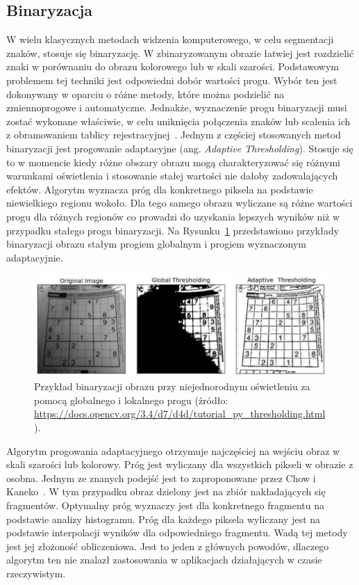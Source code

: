\subsection{Binaryzacja}\label{subsec:binaryzacja}
W wielu klasycznych metodach widzenia komputerowego, w celu segmentacji znaków, stosuje się binaryzację.
W zbinaryzowanym obrazie łatwiej jest rozdzielić znaki w porównaniu do obrazu kolorowego lub w skali szarości.
Podstawowym problemem tej techniki jest odpowiedni dobór wartości progu.
Wybór ten jest dokonywany w oparciu o różne metody, które można podzielić na zmiennoprogowe i automatyczne.
Jednakże, wyznaczenie progu binaryzacji musi zostać wykonane właściwie, w celu uniknięcia połączenia znaków lub scalenia ich z obramowaniem tablicy rejestracyjnej~\cite{6213519}.
Jednym z częściej stosowanych metod binaryzacji jest progowanie adaptacyjne (ang. \textit{Adaptive Thresholding}).
Stosuje się to w momencie kiedy różne obszary obrazu mogą charakteryzować się różnymi warunkami oświetlenia i stosowanie stałej wartości nie dałoby zadowalających efektów.
Algorytm wyznacza próg dla konkretnego piksela na podstawie niewielkiego regionu wokoło.
Dla tego samego obrazu wyliczane są różne wartości progu dla różnych regionów co prowadzi do uzyskania lepszych wyników niż w przypadku stałego progu binaryzacji.
Na Rysunku~\ref{fig:threshold} przedstawiono przykłady binaryzacji obrazu stałym progiem globalnym i progiem wyznaczonym adaptacyjnie.
\begin{figure}[!ht]
    \centering
    \includegraphics[scale=0.6]{Pictures/threshold}
    \caption{Przykład binaryzacji obrazu przy niejednorodnym oświetleniu za pomocą globalnego i lokalnego progu (źródło: \url{https://docs.opencv.org/3.4/d7/d4d/tutorial_py_thresholding.html}).}
    \label{fig:threshold}
\end{figure}
\FloatBarrier

Algorytm progowania adaptacyjnego otrzymuje najczęściej na wejściu obraz w skali szarości lub kolorowy.
Próg jest wyliczany dla wszystkich pikseli w obrazie z osobna.
Jednym ze znanych podejść jest to zaproponowane przez Chow i Kaneko~\cite{Chow1971BoundaryDO}.
W tym przypadku obraz dzielony jest na zbiór nakładających się fragmentów.
Optymalny próg wyznaczy jest dla konkretnego fragmentu na podstawie analizy histogramu.
Próg dla każdego piksela wyliczany jest na podstawie interpolacji wyników dla odpowiedniego fragmentu.
Wadą tej metody jest jej złożoność obliczeniowa.
Jest to jeden z głównych powodów, dlaczego algorytm ten nie znalazł zastosowania w aplikacjach działających w czasie rzeczywistym.

